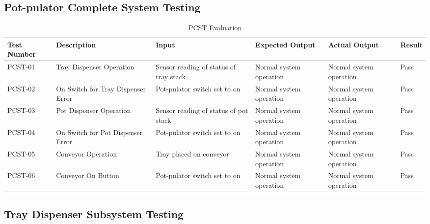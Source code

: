 \documentclass[12pt, titlepage]{article}
\begin{document}
\subsection{Pot-pulator Complete System Testing}

\begin{longtable}{ |p{}|*{4}{>{\centering\arraybackslash}p{}|}p{}|   }
  \caption{PCST Evaluation}
  \label{tab:PCST}\\
    \hline
    Test Number & Description & Input & Expected Output & Actual Output & Result\\
    \hline
    PCST-01 & Tray Dispenser Operation & Sensor reading of status of tray stack & Normal system operation & Normal system operation & Pass \\
    \hline
    PCST-02 & On Switch for Tray Dispenser Error & Pot-pulator switch set to on & Normal system operation & Normal system operation & Pass\\
    \hline
    PCST-03 & Pot Dispenser Operation & Sensor reading of status of pot stack & Normal system operation & Normal system operation & Pass\\
    \hline
    PCST-04 & On Switch for Pot Dispenser Error & Pot-pulator switch set to on & Normal system operation & Normal system operation & Pass\\
    \hline
    PCST-05 & Conveyor Operation & Tray placed on conveyor &  Normal system operation & Normal system operation & Pass\\
    \hline
    PCST-06 & Conveyor On Button & Pot-pulator switch set to on & Normal system operation & Normal system operation & Pass\\
    \hline
\end{longtable}

\subsection{Tray Dispenser Subsystem Testing}
\end{document}
